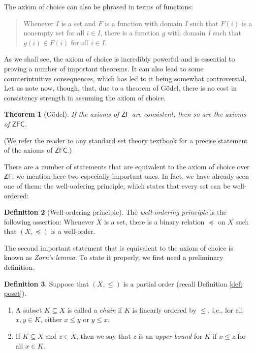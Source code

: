 \documentclass[a4paper]{memoir}
\newtheorem{theorem}{Theorem}[section]
\theoremstyle{definition}
\newtheorem{definition}[theorem]{Definition}
\begin{document}
The axiom of choice can also be phrased in terms of functions:
\begin{quote}
  Whenever $I$ is a set and $F$ is a function with domain $I$ such that $F(i)$ is a nonempty set 
  for all $i \in I$, there is a function $g$ with domain $I$ such that $g(i) \in F(i)$ for all 
  $i \in I$.
\end{quote}

As we shall see, the axiom of choice is incredibly powerful and is essential to proving a number 
of important theorems. It can also lead to some counterintuitive consequences, which has led 
to it being somewhat controversial. Let us note now, though, that, due to a theorem of 
G\"{o}del, there is no cost in consistency strength in assuming the axiom of choice.

\begin{theorem}[G\"{o}del]
  If the axioms of $\mathsf{ZF}$ are consistent, then so are the axioms of $\mathsf{ZFC}$.
\end{theorem}

(We refer the reader to any standard set theory textbook for a precise statement of the axioms 
of $\mathsf{ZFC}$.)

There are a number of statements that are equivalent to the axiom of choice over $\mathsf{ZF}$; 
we mention here two especially important ones. In fact, we have already seen one of them: the 
well-ordering principle, which states that every set can be well-ordered:

\begin{definition}[Well-ordering principle]
  The \emph{well-ordering principle} is the following assertion: Whenever $X$ is a set, there is 
  a binary relation $\preceq$ on $X$ such that $(X, \preceq)$ is a well-order.
\end{definition}

The second important statement that is equivalent to the axiom of choice is known as 
\emph{Zorn's lemma}. To state it properly, we first need a preliminary definition.

\begin{definition}
  Suppose that $(X, \leq)$ is a partial order (recall Definition \ref{def: poset}).
  \begin{enumerate}
    \item A subset $K \subseteq X$ is called a \emph{chain} if $K$ is linearly ordered by 
    $\leq$, i.e., for all $x,y \in K$, either $x \leq y$ or $y \leq x$.
    \item If $K \subseteq X$ and $z \in X$, then we say that $z$ is an \emph{upper bound} 
    for $K$ if $x \leq z$ for all $x \in K$.
  \end{enumerate}
\end{definition}
\end{document}
